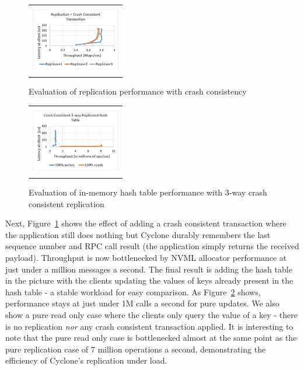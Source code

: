 \documentclass[10pt, preprint]{sigplanconf}
\begin{document}
\begin{figure}[htb]
\centering
\begin{tabular}{c}
\includegraphics[height=3cm,width=0.8\columnwidth]{results/cc_mops.pdf}
\end{tabular}
\vspace{-0.22in}
\caption{Evaluation of replication performance with crash consistency}
\label{fig:cc_rep}
\vspace{-0.08in}
\end{figure}

\begin{figure}[htb]
\centering
\begin{tabular}{c}
\includegraphics[height=3cm,width=0.8\columnwidth]{results/app_mops.pdf}
\end{tabular}
\vspace{-0.22in}
\caption{Evaluation of in-memory hash table performance with 3-way crash consistent replication}
\label{fig:app_rep}
\vspace{-0.08in}
\end{figure}

Next, Figure~\ref{fig:cc_rep} shows the effect of adding a crash consistent
transaction where the application still does nothing but Cyclone durably
remembers the last sequence number and RPC call result (the application simply
returns the received payload). Throughput is now bottlenecked by NVML allocator
performance at just under a million messages a second. The final result is
adding the hash table in the picture with the clients updating the values of
keys already present in the hash table - a stable workload for easy
comparison. As Figure~\ref{fig:app_rep} shows, performance stays at just under
1M calls a second for pure updates. We also show a pure read only case where the
clients only query the value of a key - there is no replication \emph{nor} any
crash consistent transaction applied. It is interesting to note that the pure
read only case is bottlenecked almost at the same point as the pure replication
case of 7 million operations a second, demonstrating the efficiency of Cyclone's
replication under load.
\end{document}
